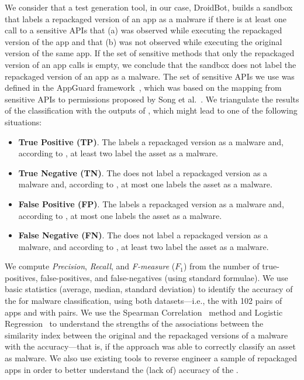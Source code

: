 We consider that a test
generation tool, in our case, DroidBot, builds a sandbox that labels a repackaged version
of an app as a malware if there is at least one call to a sensitive APIs that (a) was observed
while executing the repackaged version of the app and that (b) was not observed while
executing the original version of the same app. If the set of sensitive methods that only the repackaged version of an app calls is empty,
we conclude that the sandbox does not label the repackaged version of an app as a malware. The set of sensitive APIs we use was defined in the AppGuard framework~\cite{DBLP:conf/esorics/BackesGHMS13}, which was based on the mapping from sensitive APIs to permissions proposed by Song et al.~\cite{DBLP:conf/ccs/FeltCHSW11}. We triangulate
the results of the \mas classification with the outputs of \vt, which might lead to one of the following
situations:

\begin{itemize}
\item {\bf True Positive (TP)}. The \mas labels a repackaged version as a malware and, according to
  \vt, at least two \ses label the asset as a malware.
  
\item {\bf True Negative (TN)}. The \mas does not label a repackaged version as a malware and,
  according to \vt, at most one \se labels the asset as a malware. 

\item {\bf False Positive (FP)}. The \mas labels a repackaged version as a malware and, according to
  \vt, at most one \se labels the asset as a malware.

\item {\bf False Negative (FN)}. The \mas does not label a repackaged version as a malware, and
  according to \vt, at least two \ses label the asset as a malware.
\end{itemize}

We compute \emph{Precision}, \emph{Recall}, and \emph{F-measure} ($F_1$) from
the number of true-positives, false-positives, and false-negatives (using standard
formulae). We use basic statistics (average, median, standard deviation) to identify the
accuracy of the \mas for malware classification, using both datasets---i.e., the \sds
with 102 pairs of apps and \cds with
\apps pairs. We use the Spearman Correlation~\cite{spearman-correlation} method and
Logistic Regression~\cite{statistical-learning} to understand the strengths of
the associations between the similarity index between the original and the repackaged versions
of a malware with the \mas accuracy---that is,
if the approach was able to correctly classify an asset as malware. We also use existing tools to reverse engineer a sample of repackaged
apps in order to better understand the (lack of) accuracy
of the \mas.


